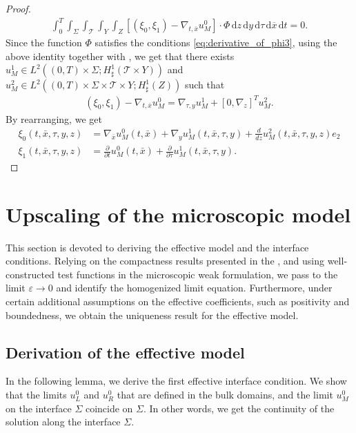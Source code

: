 \documentclass[11pt]{article}
\def\es{\varepsilon}
\def\p{\partial}
\def\mint{\int_{0}^{T}\int_{\Sigma}\int_{\mathcal{T}}\int_{Y}\int_{Z}}
\def\dzdy{\di{z}\di{y}\di{\tau}\di{\overline{x}}\di{t}}
\def\T{\mathcal{T}}
\newcommand{\di}[1]{\,\mathrm{d}#1}
\begin{document}
\begin{proof}
        \begin{align*}
            \mint[(\xi_0,\xi_1)-\nabla_{t,\bar x}u_M^0]\cdot\Phi\dzdy=0.
        \end{align*}
        Since the function $\Phi$ satisfies the conditions \eqref{eq:derivative_of_phi3}, using the above identity together with \cite[Lemma 3.7]{allaire1996multiscale}, we get that there exists $u_M^1\in L^2((0,T)\times \Sigma;H^1_{\sharp}(\T\times Y))$ and $u_M^2\in L^2((0,T)\times \Sigma \times \T\times Y;H^1_{\sharp}(Z))$ such that
        \begin{align*}
            (\xi_0,\xi_1)-\nabla_{t,\bar x}u_M^0=\nabla_{\tau,y}u_M^1+[0,\nabla_z]^Tu_M^2.
        \end{align*}
        By rearranging, we get
        \begin{align*}
            \xi_0(t,\bar x,\tau,y,z)&=\nabla_{\bar x}u_M^0(t,\bar x)+\nabla_{y}u_M^1(t,\bar x,\tau, y)+\frac{d}{dz}u_M^2(t,\bar x,\tau, y,z)e_2\\
            \xi_1(t,\bar x,\tau,y,z)&=\frac{\p}{\p t}u_M^0(t,\bar x)+\frac{\p}{\p \tau}u_M^1(t,\bar x,\tau, y).
        \end{align*}
    \end{proof}
    \section{Upscaling of the microscopic model}\label{section:Upscaling of the microscopic model}
    This section is devoted to deriving the effective model and the interface conditions. Relying on the compactness results presented in the , and using  well-constructed test functions in the microscopic weak formulation, we pass to the limit $\es\rightarrow0$ and identify the homogenized limit equation. 
   Furthermore, under certain additional assumptions on the effective coefficients, such as positivity and boundedness, we obtain the uniqueness result for the effective model.
    
    \subsection{Derivation of the effective model}
    In the following lemma, we  derive the first effective interface condition. We show that the limits $u_L^0$ and $u_R^0$ that are defined in the bulk domains, and the limit $u_M^0$ on the interface $\Sigma$ coincide on $\Sigma$. In other words, we get the continuity of the solution along the interface $\Sigma$. 
    
\end{document}
